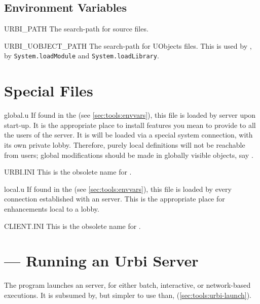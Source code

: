\subsection{Environment Variables}
\begin{envs}
\item[URBI\_PATH] The search-path for \us source files.
\item[URBI\_UOBJECT\_PATH] The search-path for UObjects files.
  This is used by , by
  \lstinline|System.loadModule| and \lstinline|System.loadLibrary|.
\end{envs}

\section{Special Files}
\label{sec:tools:files}

\begin{files}
\item[global.u] If found in the  (see
  \autoref{sec:tools:envvars}), this file is loaded by \urbi server upon
  start-up.  It is the appropriate place to install features you
  mean to provide to all the users of the server.  It is will be
  loaded via a special system connection, with its own private lobby.
  Therefore, purely local definitions will not be reachable from
  users; global modifications should be made in globally visible
  objects, say .

\item[URBI.INI] This is the obsolete name for .

\item[local.u] If found in the  (see
  \autoref{sec:tools:envvars}), this file is loaded by every
  connection established with an \urbi server.  This is the
  appropriate place for enhancements local to a lobby.

\item[CLIENT.INI] This is the obsolete name for .
\end{files}

\section{ --- Running an Urbi Server}
\label{sec:tools:urbi}

The  program launches an \urbi server, for either batch,
interactive, or network-based executions.  It is subsumed by, but
simpler to use than, 
(\autoref{sec:tools:urbi-launch}).

